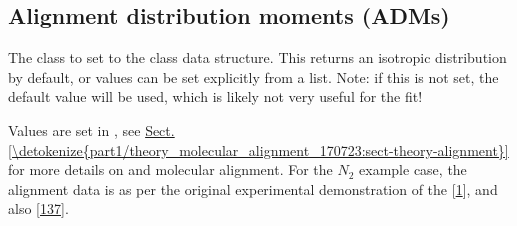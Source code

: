 \documentclass[letterpaper,table,10pt,english]{jupyterBook}
\begin{document}
\subsection{Alignment distribution moments (ADMs)}
\label{\detokenize{part2/basic_fitting_numerics_intro_260723:alignment-distribution-moments-adms}}
\sphinxAtStartPar
The class  to set {\hyperref[\detokenize{backmatter/glossary:term-ADMs}]{}} to the class data structure. This returns an isotropic distribution by default, or values can be set explicitly from a list. Note: if this is not set, the default value will be used, which is likely not very useful for the fit!

\sphinxAtStartPar
Values are set in , see \hyperref[\detokenize{part1/theory_molecular_alignment_170723:sect-theory-alignment}]{Sect.\@ \ref{\detokenize{part1/theory_molecular_alignment_170723:sect-theory-alignment}}} for more details on {\hyperref[\detokenize{backmatter/glossary:term-ADMs}]{}} and molecular alignment. For the \(N_2\) example case, the alignment data is as per the original experimental demonstration of the {\hyperref[\detokenize{backmatter/glossary:term-bootstrap-retrieval-protocol}]{}} {[}\hyperlink{cite.backmatter/bibliography:id774}{1}{]}, and also  {[}\hyperlink{cite.backmatter/bibliography:id671}{137}{]}.
\end{document}
